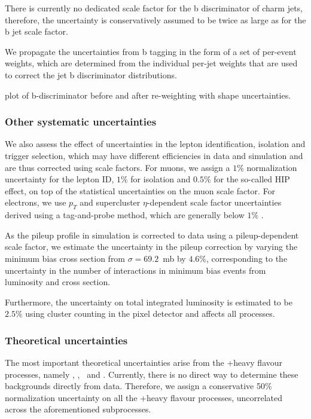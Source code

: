 There is currently no dedicated scale factor for the b discriminator of charm jets, therefore, the uncertainty is conservatively assumed to be twice as large as for the b jet scale factor.

We propagate the uncertainties from b tagging in the form of a set of per-event weights, which are determined from the individual per-jet weights that are used to correct the jet b discriminator distributions.

\fix plot of b-discriminator before and after re-weighting with shape uncertainties.

\subsubsection{Other systematic uncertainties}
We also assess the effect of uncertainties in the lepton identification, isolation and trigger selection, which may have different efficiencies in data and simulation and are thus corrected using scale factors. For muons, we assign a $1\%$ normalization uncertainty for the lepton ID, $1\%$ for isolation and $0.5\%$ for the so-called HIP effect, on top of the statistical uncertainties on the muon scale factor\cite{CMS:2017_mu_sf}. For electrons, we use $p_T$ and supercluster $\eta$-dependent scale factor uncertainties derived using a tag-and-probe method, which are generally below $1\%$ \cite{CMS:2017_ele_sf}.

As the pileup profile in simulation is corrected to data using a pileup-dependent scale factor, we estimate the uncertainty in the pileup correction by varying the minimum bias cross section from $\sigma = 69.2$~mb by $4.6\%$, corresponding to the uncertainty in the number of interactions in minimum bias events from luminosity and cross section\cite{CMS:2017_pu_weight_twiki}.

Furthermore, the uncertainty on total integrated luminosity is estimated to be $2.5\%$ using cluster counting in the pixel detector and affects all processes\cite{CMS:2017sdi,CMS:2017_lumi}.

\subsubsection{Theoretical uncertainties}
The most important theoretical uncertainties arise from the \ttbar+heavy flavour processes, namely \ttbb, \tttwob, \ttb~and \ttcc. Currently, there is no direct way to determine these backgrounds directly from data. Therefore, we assign a conservative 50\% normalization uncertainty on all the \ttbar+heavy flavour processes, uncorrelated across the aforementioned subprocesses.

